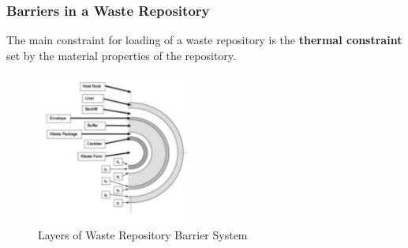 \begin{frame}
    \frametitle{Barriers in a Waste Repository}
    The main constraint for loading of a waste repository is the \textbf{thermal constraint} set by the material properties of the repository. 
    \\
    \begin{figure}[htbp!]
      \begin{center}
        \includegraphics[height=5cm]{../figures/barriers}
      \end{center}
            \caption{Layers of Waste Repository Barrier System }
    \end{figure}
  \end{frame}

